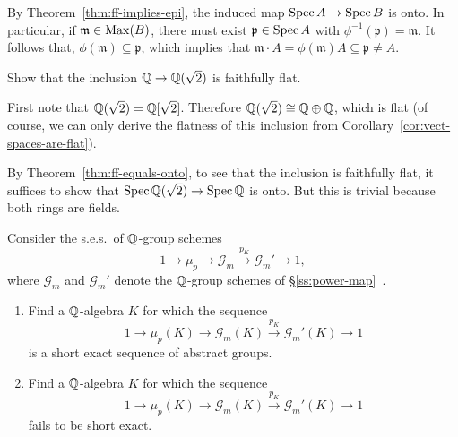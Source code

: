 \begin{solution}
    By Theorem~\ref{thm:ff-implies-epi}, the induced map $\operatorname{Spec} A\to\operatorname{Spec} B$ is onto. In particular, if $\mathfrak m\in\operatorname{Max}(B)$, there must exist $\mathfrak p\in\operatorname{Spec} A$ with $\phi^{-1}(\mathfrak p)=\mathfrak m$. It follows that, $\phi(\mathfrak m)\subseteq\mathfrak p$, which implies that $\mathfrak m\cdot A=\phi(\mathfrak m)A\subseteq\mathfrak p\ne A$.
\end{solution}

\begin{exr}
    Show that the inclusion $\mathbb{Q}\to\mathbb{Q}(\sqrt2)$ is faithfully flat.
\end{exr}

\begin{solution}
    First note that $\mathbb{Q}(\sqrt2)=\mathbb{Q}[\sqrt2]$. Therefore $\mathbb{Q}(\sqrt2)\cong\mathbb{Q}\oplus\mathbb{Q}$, which is flat (of course, we can only derive the flatness of this inclusion from Corollary~\ref{cor:vect-spaces-are-flat}).

    By Theorem~\ref{thm:ff-equals-onto}, to see that the inclusion is faithfully flat, it suffices to show that $\operatorname{Spec}\mathbb{Q}(\sqrt2)\to\operatorname{Spec}\mathbb{Q}$ is onto. But this is trivial because both rings are fields.
\end{solution}

\begin{exr}
    Consider the s.e.s.~of\/ $\mathbb{Q}$-group schemes
    $$
        1\to\mu_p\to\mathcal G_m\xrightarrow{p_K}
            \mathcal G_m'\to 1,
    $$
    where $\mathcal G_m$ and $\mathcal G_m'$ denote the $\mathbb{Q}$-group schemes of\/ {\rm\S\>\ref{ss:power-map}~}.
    \begin{enumerate}[\rm a)]
        \item Find a\/ $\mathbb{Q}$-algebra\/ $K$ for which the sequence
        $$
            1\to\mu_p(K)\to\mathcal G_m(K)\xrightarrow{p_K}
                \mathcal G_m'(K)\to1
        $$
        is a short exact sequence of abstract groups.
        
        \item Find a\/ $\mathbb{Q}$-algebra\/ $K$ for which the sequence
        $$
            1\to\mu_p(K)\to\mathcal G_m(K) \xrightarrow{p_K}
                \mathcal G_m'(K)\to1
        $$
        fails to be short exact.
    \end{enumerate}
\end{exr}

